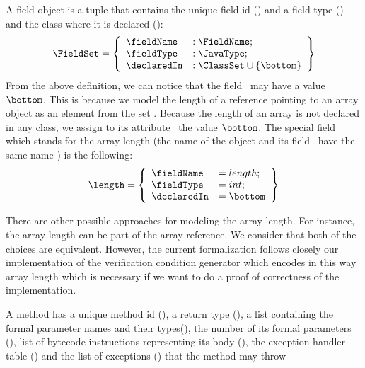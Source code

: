  A field object is a tuple that contains the unique field id (\fieldName) and a field type (\fieldType) and
 the class where it is declared (\declaredIn):  
 $$ \begin{array}{l}
         \FieldSet = \left\{\begin{array}{ll}   
		                               \fieldName  &  : \FieldName;\\
                                               \fieldType   &  : \JavaType; \\
					       \declaredIn  &  : \ClassSet \cup \{ \bottom \}
                     \end{array} \right\}
   \end{array} $$
  From the above definition, we can notice that the field \declaredIn \ may have a value $\bottom$. This is because we model 
  the length of a reference pointing to an array object as an element from the set \FieldSet. Because the length of 
  an array is not declared in any class, 
  we assign to its attribute \declaredIn \ the value $\bottom$.  
  The special field which stands for the array length  
 (the name of the object and its field  \fieldName \ have the same name ) is the following:
 $$  \length =  \left\{\begin{array}{ll} \fieldName & = length;\\
			                 \fieldType  & = int; \\
					 \declaredIn & = \bottom
                     \end{array} \right\}$$

 There are other possible approaches for modeling the array length. For instance,
 the array length can be part of the array reference. We consider that both of the choices are equivalent.
 However, the current formalization follows closely our implementation  of the verification condition 
 generator which encodes in this way array length which is necessary if we want to do a proof of correctness of the implementation.


 A method has a unique method id (\methodName), a return type (\retType),
 a list containing the formal parameter names and their types(\args), 
 the number of its formal parameters (\numArgs),
 list of bytecode instructions representing its body (\body),
 the exception handler table (\excHandlerTable) and the list of exceptions
 (\exceptions) that the method may throw

